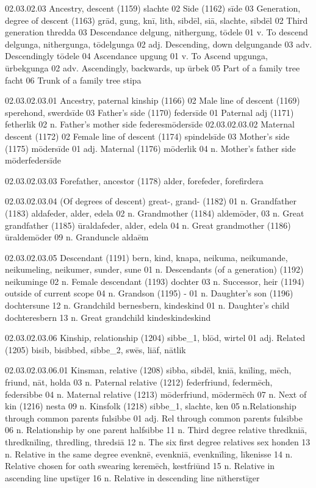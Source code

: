 02.03.02.03 Ancestry, descent (1159)		slachte
	02 Side (1162)		sīde
03 Generation, degree of descent (1163)		grād, gung, knī, lith, sibdēl, siā, slachte, sibdēl
	02 Third generation		thredda
	03 Descendance		delgung, nithergung, tōdele
		01 v. To descend		delgunga, nithergunga, tōdelgunga
		02 adj. Descending, down		delgungande
		03 adv. Descendingly		tōdele
	04 Ascendance		upgung
		01 v. To Ascend		upgunga, ūrbekgunga
		02 adv. Ascendingly, backwards, up	ūrbek
	05 Part of a family tree		facht
	06 Trunk of a family tree		stipa

02.03.02.03.01 Ancestry, paternal kinship (1166)
		02 Male line of descent (1169)		sperehond, swerdsīde
		03 Father's side (1170)		federsīde
			01 Paternal adj (1171)		fetherlik
			02 n. Father's mother side		federesmōdersīde
02.03.02.03.02 Maternal descent (1172)
		02 Female line of descent (1174)		spindelsīde
		03 Mother's side (1175)		mōdersīde
			01 adj. Maternal (1176)		mōderlik
		04 n. Mother's father side		mōderfedersīde

02.03.02.03.03 Forefather, ancestor (1178)		alder, forefeder, forefirdera
	
02.03.02.03.04 (Of degrees of descent) great-, grand- (1182)
01 n. Grandfather (1183)		aldafeder, alder, edela
02 n. Grandmother (1184)		aldemōder,
		03 n. Great grandfather (1185)		ūraldafeder, alder, edela
		04 n. Great grandmother (1186)		ūraldemōder
		09 n. Granduncle		aldaēm

02.03.02.03.05 Descendant (1191)		bern, kind, knapa, neikuma, neikumande,
 					neikumeling, neikumer, sunder, sune
		01 n. Descendants (of a generation) (1192)		neikuminge
		02 n. Female descendant (1193)		dochter
		03 n. Successor, heir (1194)		outside of current scope
		04 n. Grandson (1195)	-
			01 n. Daughter's son (1196)		dochtersune
		12 n. Grandchild		bernesbern, kindeskind
			01 n. Daughter's child		dochteresbern
		13 n. Great grandchild		kindeskindeskind

02.03.02.03.06 Kinship, relationship (1204)		sibbe\_1, blōd, wirtel
01 adj. Related (1205)		bisib, bisibbed, sibbe\_2, swēs, liāf, nātlik

02.03.02.03.06.01 Kinsman, relative (1208)		sibba, sibdēl, kniā, knīling, mēch, friund, nāt, holda
03 n. Paternal relative (1212)		federfriund, federmēch, federsibbe
04 n. Maternal relative (1213)		mōderfriund, mōdermēch
07 n. Next of kin (1216)		nesta
09 n. Kinsfolk (1218)		sibbe\_1, slachte, ken
		05 n.Relationship through common parents		fulsibbe
				01 adj. Rel through common parents				fulsibbe
06 n. Relationship by one parent				halfsibbe
		11 n. Third degree relative		thredkniā, thredknīling, thredling, thredsiā
		12 n. The six first degree relatives		sex honden
		13 n. Relative in the same degree		evenknē, evenkniā, evenknīling, līkenisse
		14 n. Relative chosen for oath swearing		keremēch, kestfriūnd
		15 n. Relative in ascending line 		upstīger
		16 n. Relative in descending line 		nītherstīger

